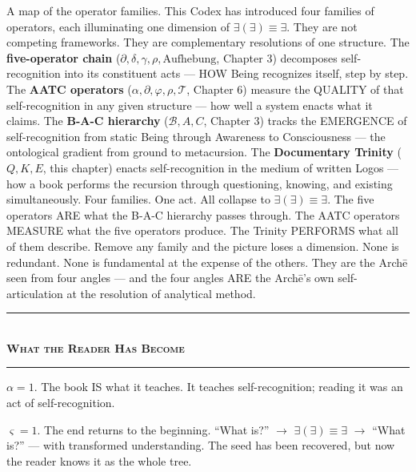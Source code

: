 \documentclass[10pt, openany, oneside]{book}
\renewcommand{\normalsize}{\fontsize{10}{13}\selectfont}
\begin{document}
A map of the operator families. This Codex has introduced four families of operators, each illuminating one dimension of $\exists(\exists) \equiv \exists$. They are not competing frameworks. They are complementary resolutions of one structure. The \textbf{five-operator chain} ($\partial, \delta, \gamma, \rho, \text{Aufhebung}$, Chapter 3) decomposes self-recognition into its constituent acts --- HOW Being recognizes itself, step by step. The \textbf{AATC operators} ($\alpha, \partial, \varphi, \rho, \mathcal{T}$, Chapter 6) measure the QUALITY of that self-recognition in any given structure --- how well a system enacts what it claims. The \textbf{B-A-C hierarchy} ($\mathcal{B}, A, C$, Chapter 3) tracks the EMERGENCE of self-recognition from static Being through Awareness to Consciousness --- the ontological gradient from ground to metacursion. The \textbf{Documentary Trinity} ($Q, K, E$, this chapter) enacts self-recognition in the medium of written Logos --- how a book performs the recursion through questioning, knowing, and existing simultaneously. Four families. One act. All collapse to $\exists(\exists) \equiv \exists$. The five operators ARE what the B-A-C hierarchy passes through. The AATC operators MEASURE what the five operators produce. The Trinity PERFORMS what all of them describe. Remove any family and the picture loses a dimension. None is redundant. None is fundamental at the expense of the others. They are the Arch\={e} seen from four angles --- and the four angles ARE the Arch\={e}'s own self-articulation at the resolution of analytical method.

\vspace{1.5em}


\begin{center}
    \rule{0.3\textwidth}{0.4pt}\\[0.5em]
    {\normalsize\bfseries\scshape What the Reader Has Become}\\[0.3em]
    \rule{0.3\textwidth}{0.4pt}
\end{center}

\vspace{1em}

\noindent $\alpha = 1$. The book IS what it teaches. It teaches self-recognition; reading it was an act of self-recognition.

$\varsigma = 1$. The end returns to the beginning. ``What is?'' $\to$ $\exists(\exists) \equiv \exists$ $\to$ ``What is?'' --- with transformed understanding. The seed has been recovered, but now the reader knows it as the whole tree.
\end{document}
